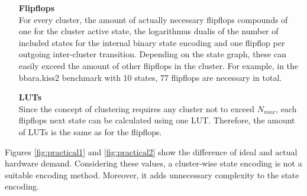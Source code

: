 \begin{itemize}
\item[\textbf{Flipflops}]\hfill \\
For every cluster, the amount of actually necessary flipflops compounds of one for the cluster active state, the logarithmus dualis of the number of included states for the internal binary state encoding and one flipflop per outgoing inter-cluster transition. Depending on the state graph, these can easily exceed the amount of other flipflops in the cluster. For example,
in the bbara.kiss2 benchmark with 10 states, 77 flipflops are necessary in total.
\item[\textbf{LUTs}]\hfill \\
Since the concept of clustering requires any cluster not to exceed $N_{max}$, each flipflops next state can be calculated using one LUT. Therefore, the amount of LUTs is the same as for the flipflops.
\end{itemize}

Figures \ref{fig:practical1} and \ref{fig:practical2} show the difference of ideal and actual hardware demand. Considering these values, a cluster-wise state encoding is not a suitable encoding method. Moreover, it adds unnecessary complexity to the state encoding.

